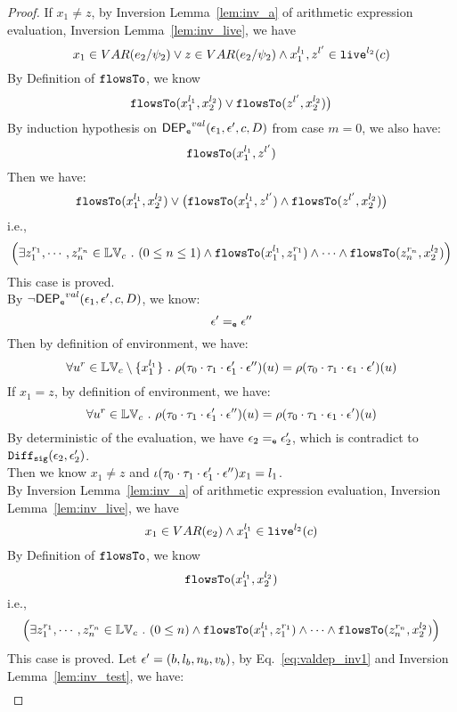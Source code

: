 {\begin{proof}
If $x_1 \neq z$, by {Inversion Lemma~\ref{lem:inv_a}} of arithmetic expression evaluation, Inversion Lemma~\ref{lem:inv_live}, we have 
%
\[
  x_1 \in VAR(e_2 / \psi_2) \lor z \in VAR(e_2 / \psi_2) 
  \land x_1^{l_1}, z^{l'} \in \mathtt{live}^{l_2}(c)
\]
%
By Definition of $\mathtt{flowsTo}$, we know
\[
  \mathtt{flowsTo}(x_1^{l_1}, x_2^{l_2}) \lor \mathtt{flowsTo}(z^{l'}, x_2^{l_2}) \big)
\]
%
By induction hypothesis on $\mathsf{DEP_{\mathtt{e}}}^{val}(\mathtt{\epsilon}_1, \mathtt{\epsilon}', c, D)$ from case $m = 0$, we also have:
\[
  \mathtt{flowsTo}(x_1^{l_1}, z^{l'})
\]
%
Then we have:
%
\[
  \mathtt{flowsTo}(x_1^{l_1}, x_2^{l_2}) \lor  \big( \mathtt{flowsTo}(x_1^{l_1}, z^{l'}) \land \mathtt{flowsTo}(z^{l'}, x_2^{l_2}) \big)
\]
%
i.e.,
%
\[
\Big(\exists z_1^{r_1}, \cdots, z_n^{r_n} \in \mathbb{LV}_{{c}} ~.~ (0 \leq n \leq 1 )
 \land \mathtt{flowsTo}(x_1^{l_1}, z_1^{r_1}) \land \cdots \land \mathtt{flowsTo}(z_n^{r_n}, {x}_2^{l_2}) \Big)
\]
%
This case is proved.
%
\\
By $\neg \mathsf{DEP_{\mathtt{e}}}^{val}(\mathtt{\epsilon}_1, \mathtt{\epsilon}', c, D)$, we know:
\[
  \mathtt{\epsilon}' =_{\mathtt{e}} \mathtt{\epsilon}''
\]
%
Then by definition of environment, we have:
\[
  \forall u^r \in \mathbb{LV}_c \setminus \{x_1^{l_1}\} ~.~
  \rho(\mathtt{\tau}_0 \cdot \mathtt{\tau}_1 \cdot \mathtt{\epsilon}_1' \cdot \mathtt{\epsilon}'') (u) =  
  \rho(\mathtt{\tau}_0 \cdot \mathtt{\tau}_1 \cdot \mathtt{\epsilon}_1 \cdot \mathtt{\epsilon}') (u)
\]
%
If $x_1 = z$, by definition of environment, we have:
\[
    \forall u^r \in \mathbb{LV}_c ~.~
  \rho(\mathtt{\tau}_0 \cdot \mathtt{\tau}_1 \cdot \mathtt{\epsilon}_1' \cdot \mathtt{\epsilon}'') (u) =  
  \rho(\mathtt{\tau}_0 \cdot \mathtt{\tau}_1 \cdot \mathtt{\epsilon}_1 \cdot \mathtt{\epsilon}') (u)
\]
By deterministic of the evaluation, we have $\mathtt{\epsilon}_2 =_{\mathtt{e}} \mathtt{\epsilon}_2'$, which is contradict to $\mathtt{Diff}_{\mathtt{sig}}(\mathtt{\epsilon}_2, \mathtt{\epsilon}_2')$.
%
\\
Then we know $x_1 \neq z$ and $\iota(\mathtt{\tau}_0 \cdot \mathtt{\tau}_1 \cdot \mathtt{\epsilon}_1' \cdot \mathtt{\epsilon}'') x_1 = l_1$.
\\
%
By {Inversion Lemma~\ref{lem:inv_a}} of arithmetic expression evaluation, Inversion Lemma~\ref{lem:inv_live}, we have 
\[
  x_1 \in VAR(e_2) \land x_1^{l_1} \in \mathtt{live}^{l_2}(c)
\]
%
By Definition of $\mathtt{flowsTo}$, we know
\[
  \mathtt{flowsTo}(x_1^{l_1}, x_2^{l_2}) 
\]
%
i.e.,
%
\[
\Big(\exists z_1^{r_1}, \cdots, z_n^{r_n} \in \mathbb{LV}_{{c}} ~.~ (0 \leq n  )
 \land \mathtt{flowsTo}(x_1^{l_1}, z_1^{r_1}) \land \cdots \land \mathtt{flowsTo}(z_n^{r_n}, {x}_2^{l_2}) \Big)
\]
This case is proved.
%
%
Let $\mathtt{\epsilon}' = (b, l_b, n_b, v_b)$, by Eq.~\ref{eq:valdep_inv1} and {Inversion Lemma~\ref{lem:inv_test}}, we have:
\begin{equation}
\label{eq:m1test_inv1}
  \begin{array}{l}   

\end{array}
\end{equation}
\end{proof}}
